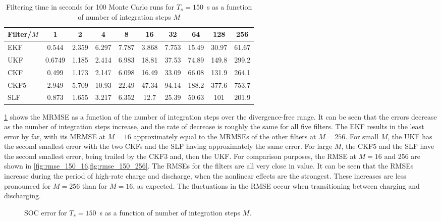 \documentclass[../zhang_thesis.tex]{subfiles}
\begin{document}
\begin{table}[h]
\centering
\caption{Filtering time in seconds for 100 Monte Carlo runs for $T_s=150$~s as a function of number of integration steps $M$}
\begin{tabular}{@{}lccccccccc@{}}
\toprule
Filter/$M$ & 1      & 2     & 4     & 8     & 16    & 32    & 64    & 128   & 256   \\ \midrule
EKF        & 0.544  & 2.359 & 6.297 & 7.787 & 3.868 & 7.753 & 15.49 & 30.97 & 61.67 \\
UKF        & 0.6749 & 1.185 & 2.414 & 6.983 & 18.81 & 37.53 & 74.89 & 149.8 & 299.2 \\
CKF        & 0.499  & 1.173 & 2.147 & 6.098 & 16.49 & 33.09 & 66.08 & 131.9 & 264.1 \\
CKF5       & 2.949  & 5.709 & 10.93 & 22.49 & 47.34 & 94.14 & 188.2 & 377.6 & 753.7 \\
SLF        & 0.873  & 1.655 & 3.217 & 6.352 & 12.7  & 25.39 & 50.63 & 101   & 201.9 \\ \bottomrule
\end{tabular}
\label{tab:time_150}
\end{table}

\cref{fig:mrmse_150} shows the MRMSE as a function of the number of integration steps over the divergence-free range. It can be seen that the errors decrease as the number of integration steps increase, and the rate of decrease is roughly the same for all five filters. The EKF results in the least error by far, with its MRMSE at $M=16$ approximately equal to the MRMSEs of the other filters at $M=256$. For small $M$, the UKF has the second smallest error with the two CKFs and the SLF having approximately the same error. For large $M$, the CKF5 and the SLF have the second smallest error, being trailed by the CKF3 and, then the UKF. For comparison purposes, the RMSE at $M=16$ and 256 are shown in \cref{fig:rmse_150_16,fig:rmse_150_256}. The RMSEs for the filters are all very close in value. It can be seen that the RMSEs increase during the period of high-rate charge and discharge, when the nonlinear effects are the strongest. These increases are less pronounced for $M=256$ than for $M=16$, as expected. The fluctuations in the RMSE occur when transitioning between charging and discharging.

\begin{figure}[b]
\centering
%
\caption{SOC error for $T_s=150$~s as a function of number of integration steps $M$.}
\label{fig:mrmse_150}
\end{figure}
\end{document}
